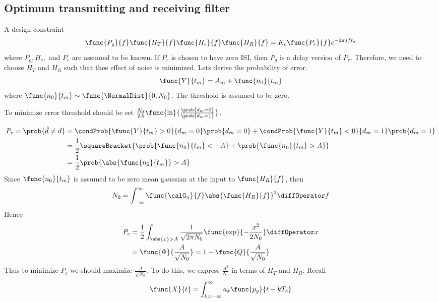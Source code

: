 \subsection{Optimum transmitting and receiving filter}
A design constraint 
\begin{equation*}
    \func{P_g}{f} \func{H_T}{f} \func{H_c}{f}\func{H_R}{f} = K_c \func{P_r}{f} e^{-2\pi j ft_d}
\end{equation*}
where \(P_g,H_c,\) and \(P_r\) are assumed to be known. If \(P_r\) is chosen to have zero ISI, then \(P_g\) is a delay version of \(P_r\). Therefore, we need to choose \(H_T\) and \(H_R\) such that thee effect of noise is minimized. Lets derive the probability of error. 
\begin{equation*}
    \func{Y}{t_m} = A_m + \func{n_0}{t_m}
\end{equation*}
where \(\func{n_0}{t_m} \sim \func{\NormalDist}{0,N_0}\). The threshold is assumed to be zero.
\begin{remark}
    To minimize error threshold should be set \(\frac{N_0}{2A} \func{\ln}{\frac{\prob{d_m = 0}}{\prob{d_m =1 }}}\).
\end{remark}
\begin{align*}
    P_e = \prob{\hat{d} \neq d} &= \condProb{\func{Y}{t_m} > 0}{d_m = 0} \prob{d_m = 0} + \condProb{\func{Y}{t_m} < 0}{d_m = 1} \prob{d_m = 1}\\
    &= \dfrac{1}{2} \squareBracket{\prob{\func{n_0}{t_m} < -A} + \prob{\func{n_0}{t_m} > A}}\\
    &= \dfrac{1}{2} \prob{\abs{\func{n_0}{t_m}} > A} 
\end{align*}
Since \(\func{n_0}{t_m}\) is assumed to be zero mean gaussian at the input to \(\func{H_R}{f}\), then 
\begin{equation*}
    N_0 = \int_{-\infty}^{\infty} \func{\calG_n}{f} \abs{\func{H_R}{f}}^2 \diffOperator f
\end{equation*}
Hence 
\begin{align*}
    P_e &= \dfrac{1}{2} \int_{\abs{x} > A} \dfrac{1}{\sqrt{2\pi N_0}} \func{\exp}{-\dfrac{x^2}{2N_0}} \diffOperator x\\
    &= \func{\Phi}{\dfrac{A}{\sqrt{N_0}}} = 1 - \func{Q}{\dfrac{A}{\sqrt{N_0}}}
\end{align*}
Thus to minimize \(P_e\) we should maximize \(\frac{A}{\sqrt{N_0}}\). To do this, we express \(\frac{A^2}{N_0}\) in terms of \(H_T\) and \(H_R\). Recall
\begin{equation*}
    \func{X}{t} = \int_{k = -\infty}^{\infty} a_k \func{p_g}{t - kT_b}
\end{equation*}
